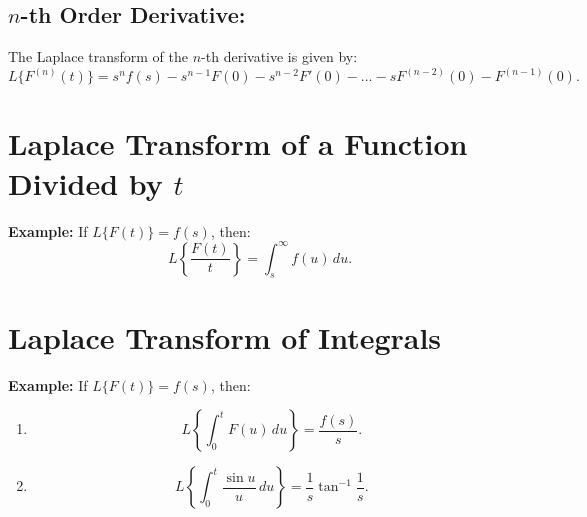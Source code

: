 \documentclass[a4paper,12pt]{article}
\begin{document}
\subsection*{$n$-th Order Derivative:}
The Laplace transform of the $n$-th derivative is given by:
\[
L\{F^{(n)}(t)\} = s^n f(s) - s^{n-1} F(0) - s^{n-2} F'(0) - \dots - s F^{(n-2)}(0) - F^{(n-1)}(0).
\]

\section*{Laplace Transform of a Function Divided by $t$}

\textbf{Example:} If $ L\{F(t)\} = f(s) $, then:
\[
L\left\{\frac{F(t)}{t}\right\} = \int_s^\infty f(u) \, du.
\]


\section*{Laplace Transform of Integrals}

\textbf{Example:} If $ L\{F(t)\} = f(s) $, then:
\begin{enumerate}
    \item
    \[
    L\left\{\int_0^t F(u) \, du\right\} = \frac{f(s)}{s}.
    \]

    \item
    \[
    L\left\{\int_0^t \frac{\sin u}{u} \, du\right\} = \frac{1}{s} \tan^{-1}\frac{1}{s}.
    \]
\end{enumerate}
\end{document}
